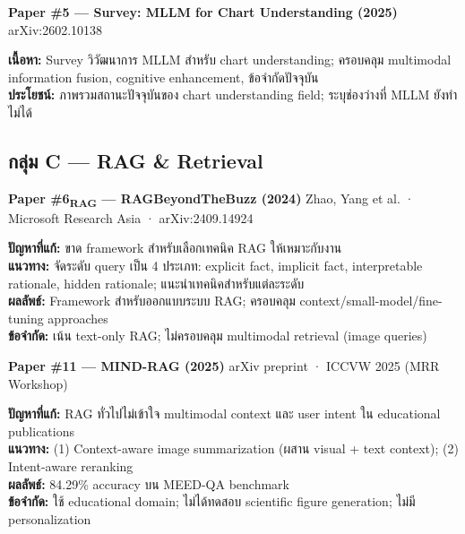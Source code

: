 \documentclass[10pt,a4paper]{article}
\begin{document}
\vspace{6pt}
\textbf{Paper \#5 — Survey: MLLM for Chart Understanding (2025)}
\hfill {\color{muted}\small arXiv:2602.10138}

\begin{infobox}
\textbf{เนื้อหา:} Survey วิวัฒนาการ MLLM สำหรับ chart understanding; ครอบคลุม multimodal information fusion, cognitive enhancement, ข้อจำกัดปัจจุบัน\\
\textbf{ประโยชน์:} ภาพรวมสถานะปัจจุบันของ chart understanding field; ระบุช่องว่างที่ MLLM ยังทำไม่ได้
\end{infobox}

\vspace{10pt}
\subsection*{\textcolor{accent-teal}{กลุ่ม C — RAG \& Retrieval}}

\textbf{Paper \#6\textsubscript{RAG} — RAGBeyondTheBuzz (2024)}
\hfill {\color{muted}\small Zhao, Yang et al. · Microsoft Research Asia · arXiv:2409.14924}

\begin{infobox}
\textbf{ปัญหาที่แก้:} ขาด framework สำหรับเลือกเทคนิค RAG ให้เหมาะกับงาน\\
\textbf{แนวทาง:} จัดระดับ query เป็น 4 ประเภท: explicit fact, implicit fact, interpretable rationale, hidden rationale; แนะนำเทคนิคสำหรับแต่ละระดับ\\
\textbf{ผลลัพธ์:} Framework สำหรับออกแบบระบบ RAG; ครอบคลุม context/small-model/fine-tuning approaches\\
\textbf{ข้อจำกัด:} เน้น text-only RAG; ไม่ครอบคลุม multimodal retrieval (image queries)
\end{infobox}

\vspace{6pt}
\textbf{Paper \#11 — MIND-RAG (2025)}
\hfill {\color{muted}\small arXiv preprint · ICCVW 2025 (MRR Workshop)}

\begin{infobox}
\textbf{ปัญหาที่แก้:} RAG ทั่วไปไม่เข้าใจ multimodal context และ user intent ใน educational publications\\
\textbf{แนวทาง:} (1) Context-aware image summarization (ผสาน visual + text context); (2) Intent-aware reranking\\
\textbf{ผลลัพธ์:} 84.29\% accuracy บน MEED-QA benchmark\\
\textbf{ข้อจำกัด:} ใช้ educational domain; ไม่ได้ทดสอบ scientific figure generation; ไม่มี personalization
\end{infobox}
\end{document}
